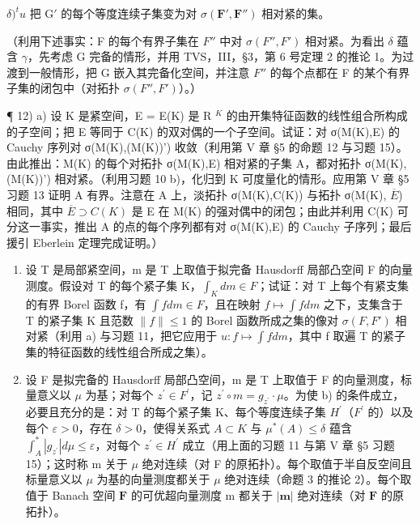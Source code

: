 \(\delta)^{t}u\) 把 \(\mathrm{G}'\) 的每个等度连续子集变为对 \(\sigma (\mathbf{F}',\mathbf{F}'')\) 相对紧的集。

（利用下述事实：F 的每个有界子集在 \(F''\) 中对 \(\sigma(F'', F')\) 相对紧。为看出 \(\delta\) 蕴含 \(\gamma\)，先考虑 G 完备的情形，并用 TVS，III，§3，第 6 号定理 2 的推论 1。为过渡到一般情形，把 G 嵌入其完备化空间，并注意 \(F''\) 的每个点都在 F 的某个有界子集的闭包中（对拓扑 \(\sigma(F'', F')\)）。）

¶ 12) a) 设 K 是紧空间，E = E(K) 是 R \(^{K}\) 的由开集特征函数的线性组合所构成的子空间；把 E 等同于 C(K) 的双对偶的一个子空间。试证：对 σ(M(K),E) 的 Cauchy 序列对 σ(M(K),(M(K))') 收敛（利用第 V 章 §5 的命题 12 与习题 15）。由此推出：M(K) 的每个对拓扑 σ(M(K),E) 相对紧的子集 A，都对拓扑 σ(M(K),(M(K))') 相对紧。（利用习题 10 b)，化归到 K 可度量化的情形。应用第 V 章 §5 习题 13 证明 A 有界。注意在 A 上，淡拓扑 σ(M(K),C(K)) 与拓扑 σ(M(K), \(\overline{E}\)) 相同，其中 \(\overline{E} \supset C(K)\) 是 E 在 M(K) 的强对偶中的闭包；由此并利用 C(K) 可分这一事实，推出 A 的点的每个序列都有对 σ(M(K),E) 的 Cauchy 子序列；最后援引 Eberlein 定理完成证明。）

\begin{enumerate}
\def\labelenumi{\alph{enumi})}
\setcounter{enumi}{1}
\item
  设 T 是局部紧空间，m 是 T 上取值于拟完备 Hausdorff 局部凸空间 F 的向量测度。假设对 T 的每个紧子集 K，\(\int_{K} dm \in F\)；试证：对 T 上每个有紧支集的有界 Borel 函数 f，有 \(\int f dm \in F\)，且在映射 \(f \mapsto \int f dm\) 之下，支集含于 T 的紧子集 K 且范数 \(\|f\| \leqslant 1\) 的 Borel 函数所成之集的像对 \(\sigma(F, F')\) 相对紧（利用 a) 与习题 11，把它应用于 \(u : f \mapsto \int f dm\)，其中 f 取遍 T 的紧子集的特征函数的线性组合所成之集）。
\item
  设 F 是拟完备的 Hausdorff 局部凸空间，m 是 T 上取值于 F 的向量测度，标量意义以 \(\mu\) 为基；对每个 \(z^{\prime} \in F^{\prime}\)，记 \(z^{\prime} \circ m = g_{z^{\prime}} \cdot \mu\)。为使 b) 的条件成立，必要且充分的是：对 T 的每个紧子集 K、每个等度连续子集 \(H^{\prime}\)（\(F^{\prime}\) 的）以及每个 \(\varepsilon > 0\)，存在 \(\delta > 0\)，使得关系式 \(A \subset K\) 与 \(\mu^{*}(A) \leqslant \delta\) 蕴含 \(\int_{A}^{*}|g_{z^{\prime}}| d\mu \leqslant \varepsilon\)，对每个 \(z^{\prime} \in H^{\prime}\) 成立（用上面的习题 11 与第 V 章 §5 习题 15）；这时称 m 关于 \(\mu\) 绝对连续（对 F 的原拓扑）。每个取值于半自反空间且标量意义以 \(\mu\) 为基的向量测度都关于 \(\mu\) 绝对连续（命题 3 的推论 2）。每个取值于 Banach 空间 \(\mathbf{F}\) 的可优超向量测度 m 都关于 \(|\mathbf{m}|\) 绝对连续（对 \(\mathbf{F}\) 的原拓扑）。
\end{enumerate}

